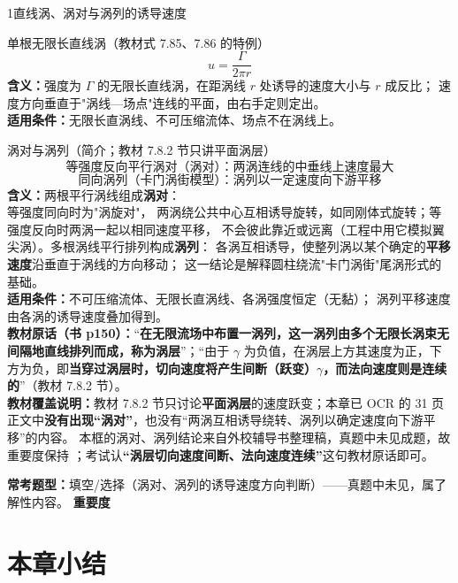 \begin{kaodian}{1}{直线涡、涡对与涡列的诱导速度}
\begin{gongshi}{单根无限长直线涡（教材式 7.85、7.86 的特例）}
\[ u=\frac{\Gamma}{2\pi r} \]
\textbf{含义：}强度为 $\Gamma$ 的无限长直线涡，在距涡线 $r$ 处诱导的速度大小与 $r$ 成反比；
速度方向垂直于"涡线—场点"连线的平面，由右手定则定出。\\
\textbf{适用条件：}无限长直涡线、不可压缩流体、场点不在涡线上。
\end{gongshi}

\begin{gongshi}{涡对与涡列（简介；教材 7.8.2 节只讲平面涡层）}
\[ \text{等强度反向平行涡对（涡对）：两涡连线的中垂线上速度最大} \]
\[ \text{同向涡列（卡门涡街模型）：涡列以一定速度向下游平移} \]
\textbf{含义：}两根平行涡线组成\textbf{涡对}：\\等强度同向时为"涡旋对"，
两涡绕公共中心互相诱导旋转，如同刚体式旋转；等强度反向时两涡一起以相同速度平移，
不会彼此靠近或远离（工程中用它模拟翼尖涡）。多根涡线平行排列构成\textbf{涡列}：
各涡互相诱导，使整列涡以某个确定的\textbf{平移速度}沿垂直于涡线的方向移动；
这一结论是解释圆柱绕流"卡门涡街"尾涡形式的基础。\\
\textbf{适用条件：}不可压缩流体、无限长直涡线、各涡强度恒定（无黏）；
涡列平移速度由各涡的诱导速度叠加得到。\\
\textbf{教材原话（书 p150）：}“\textbf{在无限流场中布置一涡列，这一涡列由多个无限长涡束无间隔地直线排列而成，称为涡层}”；“由于 $\gamma$ 为负值，在涡层上方其速度为正，下方为负，即\textbf{当穿过涡层时，切向速度将产生间断（跃变）$\gamma$，而法向速度则是连续的}”（教材 7.8.2 节）。\\
\textbf{教材覆盖说明：}教材 7.8.2 节只讨论\textbf{平面涡层}的速度跃变；本章已 OCR 的 31 页正文中\textbf{没有出现“涡对”}，也没有“两涡互相诱导绕转、涡列以确定速度向下游平移”的内容。
本框的涡对、涡列结论来自外校辅导书整理稿，真题中未见成题，故重要度保持 ；考试认\textbf{“涡层切向速度间断、法向速度连续”}这句教材原话即可。
\end{gongshi}
\textbf{常考题型：}填空/选择（涡对、涡列的诱导速度方向判断）——真题中未见，属了解性内容。
\textbf{重要度 }\quad{}\quad{}
\end{kaodian}

\section{本章小结}

